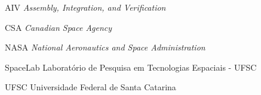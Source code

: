 
\begin{siglas}
  \item[ AIV ] \emph{Assembly, Integration, and Verification}
  \item[ CSA ] \textit{Canadian Space Agency}
  \item[ NASA ] \textit{National Aeronautics and Space Administration}
  \item[ SpaceLab ] Laboratório de Pesquisa em Tecnologias Espaciais - UFSC
  \item[ UFSC ] Universidade Federal de Santa Catarina
\end{siglas}
